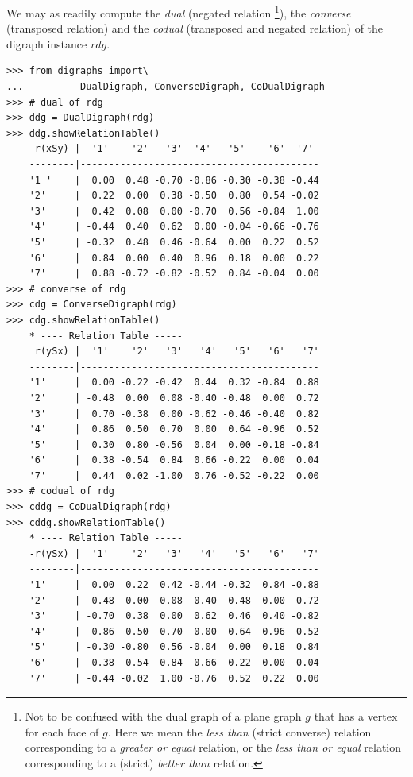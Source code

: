 We may as readily compute the \emph{dual} (negated relation \footnote{Not to be confused with the dual graph of a plane graph $g$ that has a vertex for each face of $g$. Here we mean the \emph{less than} (strict converse) relation corresponding to a \emph{greater or equal} relation, or the \emph{less than or equal} relation corresponding to a (strict) \emph{better than} relation.}), the \emph{converse} (transposed relation) and the \emph{codual} (transposed and negated relation) of the digraph instance $rdg$. 
\begin{lstlisting}[caption={Computing associated dual, converse and codual digraphs},label=list:2.7]
>>> from digraphs import\
...          DualDigraph, ConverseDigraph, CoDualDigraph
>>> # dual of rdg
>>> ddg = DualDigraph(rdg)
>>> ddg.showRelationTable()
    -r(xSy) |  '1'    '2'   '3'  '4'   '5'    '6'  '7'	  
    --------|------------------------------------------
    '1 '    |  0.00  0.48 -0.70 -0.86 -0.30 -0.38 -0.44	 
    '2'     |  0.22  0.00  0.38 -0.50  0.80  0.54 -0.02	 
    '3'     |  0.42  0.08  0.00 -0.70  0.56 -0.84  1.00	 
    '4'     | -0.44  0.40  0.62  0.00 -0.04 -0.66 -0.76	 
    '5'     | -0.32  0.48  0.46 -0.64  0.00  0.22  0.52	 
    '6'     |  0.84  0.00  0.40  0.96  0.18  0.00  0.22	 
    '7'     |  0.88 -0.72 -0.82 -0.52  0.84 -0.04  0.00
>>> # converse of rdg
>>> cdg = ConverseDigraph(rdg)
>>> cdg.showRelationTable()
    * ---- Relation Table -----
     r(ySx) |  '1'    '2'   '3'   '4'   '5'   '6'   '7'	  
    --------|------------------------------------------
    '1'     |  0.00 -0.22 -0.42  0.44  0.32 -0.84  0.88	 
    '2'     | -0.48  0.00  0.08 -0.40 -0.48  0.00  0.72	 
    '3'     |  0.70 -0.38  0.00 -0.62 -0.46 -0.40  0.82	 
    '4'     |  0.86  0.50  0.70  0.00  0.64 -0.96  0.52	 
    '5'     |  0.30  0.80 -0.56  0.04  0.00 -0.18 -0.84	 
    '6'     |  0.38 -0.54  0.84  0.66 -0.22  0.00  0.04	 
    '7'     |  0.44  0.02 -1.00  0.76 -0.52 -0.22  0.00	 
>>> # codual of rdg
>>> cddg = CoDualDigraph(rdg)
>>> cddg.showRelationTable()
    * ---- Relation Table -----
    -r(ySx) |  '1'    '2'   '3'   '4'   '5'   '6'   '7'	    
    --------|------------------------------------------
    '1'     |  0.00  0.22  0.42 -0.44 -0.32  0.84 -0.88	 
    '2'     |  0.48  0.00 -0.08  0.40  0.48  0.00 -0.72	 
    '3'     | -0.70  0.38  0.00  0.62  0.46  0.40 -0.82	 
    '4'     | -0.86 -0.50 -0.70  0.00 -0.64  0.96 -0.52	 
    '5'     | -0.30 -0.80  0.56 -0.04  0.00  0.18  0.84	 
    '6'     | -0.38  0.54 -0.84 -0.66  0.22  0.00 -0.04	 
    '7'     | -0.44 -0.02  1.00 -0.76  0.52  0.22  0.00	 
\end{lstlisting}

